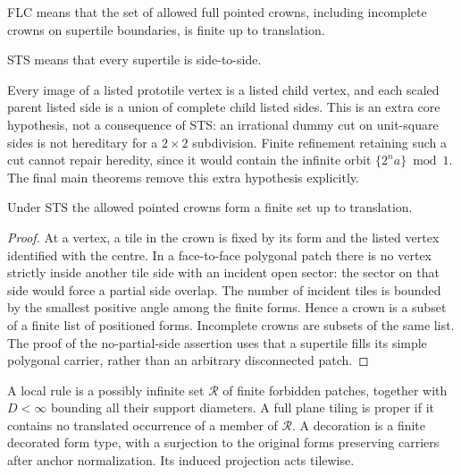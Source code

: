 \begin{definition}\label{def:flc}
FLC means that the set of allowed full pointed crowns, including incomplete
crowns on supertile boundaries, is finite up to translation.
\end{definition}

\begin{definition}\label{def:sts}
STS means that every supertile is side-to-side.
\end{definition}


\begin{definition}\label{def:hereditary}
Every image of a listed prototile vertex is a listed child vertex, and each
scaled parent listed side is a union of complete child listed sides.
This is an extra core hypothesis, not a consequence of STS: an irrational
dummy cut on unit-square sides is not hereditary for a $2\times2$ subdivision.
Finite refinement retaining such a cut cannot repair heredity, since it
would contain the infinite orbit $\{2^n a\}\bmod1$.
The final main theorems remove this extra hypothesis explicitly.
\end{definition}

\begin{lemma}\label{lem:sts-flc}
Under STS the allowed pointed crowns form a finite set up to translation.
\end{lemma}
\begin{proof}
At a vertex, a tile in the crown is fixed by its form and the listed vertex
identified with the centre. In a face-to-face polygonal patch there is no
vertex strictly inside another tile side with an incident open sector:
the sector on that side would force a partial side overlap. The number of
incident tiles is bounded by the smallest positive angle among the finite
forms. Hence a crown is a subset of a finite list of positioned forms.
Incomplete crowns are subsets of the same list.
The proof of the no-partial-side assertion uses that a supertile fills its
simple polygonal carrier, rather than an arbitrary disconnected patch.
\end{proof}

\begin{definition}\label{def:localrule}
A local rule is a possibly infinite set $\mathcal R$ of finite forbidden
patches, together with $D<\infty$ bounding all their support diameters.
A full plane tiling is proper if it contains no translated occurrence of
a member of $\mathcal R$. A decoration is a finite decorated form type,
with a surjection to the original forms preserving carriers after anchor
normalization. Its induced projection acts tilewise.
\end{definition}


